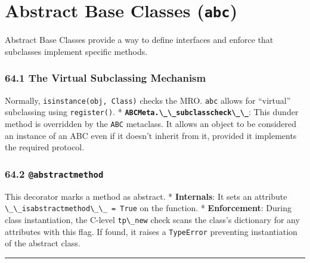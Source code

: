 \hypertarget{abstract-base-classes-abc}{%
\chapter{\texorpdfstring{Abstract Base Classes
(\texttt{abc})}{Abstract Base Classes (abc)}}\label{abstract-base-classes-abc}}

Abstract Base Classes provide a way to define interfaces and enforce
that subclasses implement specific methods.

\hypertarget{the-virtual-subclassing-mechanism}{%
\subsection{64.1 The Virtual Subclassing
Mechanism}\label{the-virtual-subclassing-mechanism}}

Normally, \passthrough{\lstinline!isinstance(obj, Class)!} checks the
MRO. \passthrough{\lstinline!abc!} allows for ``virtual'' subclassing
using \passthrough{\lstinline!register()!}. *
\textbf{\passthrough{\lstinline!ABCMeta.\_\_subclasscheck\_\_!}}: This
dunder method is overridden by the \passthrough{\lstinline!ABC!}
metaclass. It allows an object to be considered an instance of an ABC
even if it doesn't inherit from it, provided it implements the required
protocol.

\hypertarget{abstractmethod}{%
\subsection{\texorpdfstring{64.2
\texttt{@abstractmethod}}{64.2 @abstractmethod}}\label{abstractmethod}}

This decorator marks a method as abstract. * \textbf{Internals}: It sets
an attribute \passthrough{\lstinline!\_\_isabstractmethod\_\_ = True!}
on the function. * \textbf{Enforcement}: During class instantiation, the
C-level \passthrough{\lstinline!tp\_new!} check scans the class's
dictionary for any attributes with this flag. If found, it raises a
\passthrough{\lstinline!TypeError!} preventing instantiation of the
abstract class.

\begin{center}\rule{0.5\linewidth}{0.5pt}\end{center}
